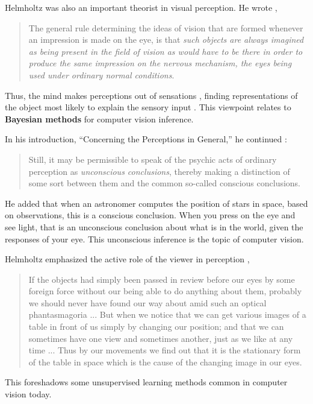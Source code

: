 Helmholtz was also an important theorist in visual perception.  He wrote \cite{Helmholtz62},
\begin{quote}
    The general rule determining the ideas of vision that are formed whenever an impression is made on the eye, is that {\em such objects are always imagined as being present in the field of vision as would have to be there in order to produce the same impression on the nervous mechanism, the eyes being used under ordinary normal conditions}.
\end{quote}

Thus, the mind makes perceptions out of sensations \cite{Shapin2019}, finding representations of the object most likely to explain the sensory input \cite{Wandell95}.  This viewpoint relates to {\bf Bayesian methods} for computer vision inference.

In his introduction, ``Concerning the Perceptions in General,'' he continued \cite{Helmholtz62}:
\begin{quote}
    Still, it may be permissible to speak of the psychic acts of ordinary perception as {\em unconscious conclusions}, thereby making a distinction of some sort between them and the common so-called conscious conclusions.
\end{quote}
He added that when an astronomer computes the position of stars in space, based on observations, this is a conscious conclusion. When you press on the eye and see light, that is an unconscious conclusion about what is in the world, given the responses of your eye. This unconscious inference is the topic of computer vision.


Helmholtz emphasized the active role of the viewer in perception \cite{Helmholtz62},
\begin{quote}
    If the objects had simply been passed in review before our eyes by some foreign force without our being able to do anything about them, probably we should never have found our way about amid such an optical phantasmagoria ... But when we notice that we can get various images of a table in front of us simply by changing our position; and that we can sometimes have one view and sometimes another, just as we like at any time ... Thus by our movements we find out that it is the stationary form of the table in space which is the cause of the changing image in our eyes.
\end{quote}
This foreshadows some unsupervised learning methods common in computer vision today.


